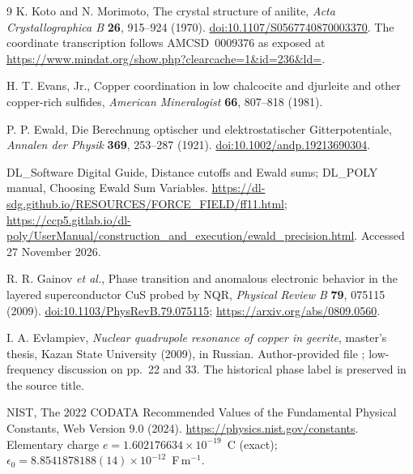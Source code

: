 \documentclass[11pt,a4paper]{article}
\begin{document}
\begin{thebibliography}{9}
K. Koto and N. Morimoto, The crystal structure of anilite,
\emph{Acta Crystallographica B} \textbf{26}, 915--924 (1970).
\href{https://doi.org/10.1107/S0567740870003370}{doi:10.1107/S0567740870003370}.
The coordinate transcription follows AMCSD~0009376 as exposed at
\url{https://www.mindat.org/show.php?clearcache=1&id=236&ld=}.

H. T. Evans, Jr., Copper coordination in low chalcocite and djurleite and other
copper-rich sulfides, \emph{American Mineralogist} \textbf{66}, 807--818 (1981).

P. P. Ewald, Die Berechnung optischer und elektrostatischer Gitterpotentiale,
\emph{Annalen der Physik} \textbf{369}, 253--287 (1921).
\href{https://doi.org/10.1002/andp.19213690304}{doi:10.1002/andp.19213690304}.

DL\_Software Digital Guide, Distance cutoffs and Ewald sums;
DL\_POLY manual, Choosing Ewald Sum Variables.
\url{https://dl-sdg.github.io/RESOURCES/FORCE_FIELD/ff11.html};
\url{https://ccp5.gitlab.io/dl-poly/UserManual/construction_and_execution/ewald_precision.html}.
Accessed 27 November 2026.

R. R. Gainov \emph{et al.}, Phase transition and anomalous electronic behavior
in the layered superconductor CuS probed by NQR,
\emph{Physical Review B} \textbf{79}, 075115 (2009).
\href{https://doi.org/10.1103/PhysRevB.79.075115}{doi:10.1103/PhysRevB.79.075115};
\url{https://arxiv.org/abs/0809.0560}.

I. A. Evlampiev, \emph{Nuclear quadrupole resonance of copper in geerite},
master's thesis, Kazan State University (2009), in Russian.
Author-provided file ;
low-frequency discussion on pp.~22 and 33. The historical phase label is
preserved in the source title.

NIST, The 2022 CODATA Recommended Values of the Fundamental Physical Constants,
Web Version 9.0 (2024). \url{https://physics.nist.gov/constants}.
Elementary charge $e=1.602176634\times10^{-19}$~C (exact);
$\epsilon_0=8.8541878188(14)\times10^{-12}$~F\,m$^{-1}$.
\end{thebibliography}
\end{document}
